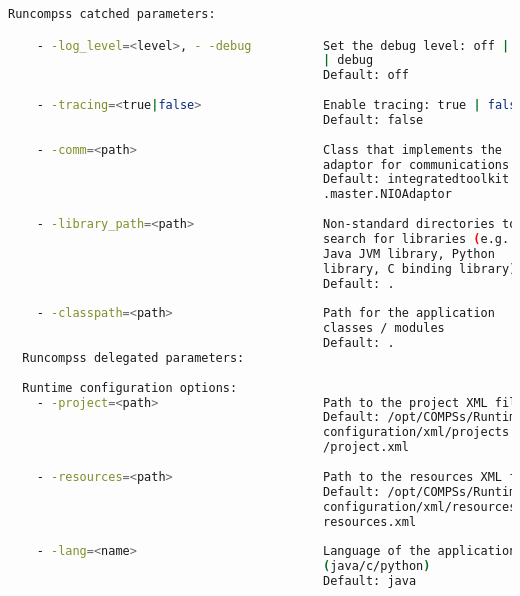 \begin{lstlisting}[language=bash]
  Runcompss catched parameters:

    - -log_level=<level>, - -debug          Set the debug level: off | info 
                                            | debug
                                            Default: off
                                            
    - -tracing=<true|false>                 Enable tracing: true | false
                                            Default: false
                                            
    - -comm=<path>                          Class that implements the 
                                            adaptor for communications
                                            Default: integratedtoolkit.nio
                                            .master.NIOAdaptor
                                            
    - -library_path=<path>                  Non-standard directories to
                                            search for libraries (e.g. 
                                            Java JVM library, Python
                                            library, C binding library) 
                                            Default: .
                                            
    - -classpath=<path>                     Path for the application 
                                            classes / modules
                                            Default: .
  Runcompss delegated parameters:
                                            
  Runtime configuration options:
    - -project=<path>                       Path to the project XML file
                                            Default: /opt/COMPSs/Runtime/
                                            configuration/xml/projects
                                            /project.xml
                                            
    - -resources=<path>                     Path to the resources XML file
                                            Default: /opt/COMPSs/Runtime/
                                            configuration/xml/resources/
                                            resources.xml
                                            
    - -lang=<name>                          Language of the application
                                            (java/c/python)
                                            Default: java
                                            

\end{lstlisting}
